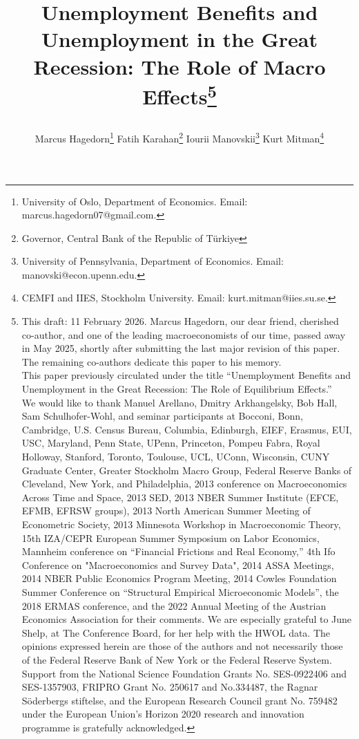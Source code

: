 \documentclass[12pt]{article}
\renewcommand{\baselinestretch}{1.5}
\newcommand{\1}{\mathbf{1}}
\begin{document}
\renewcommand{\baselinestretch}{1}

\title{{ Unemployment Benefits and Unemployment in the Great Recession: The Role of Macro Effects\footnote{This draft: 11 February 2026.
Marcus Hagedorn, our dear friend, cherished co-author, and one of the leading macroeconomists of our time, passed away in May 2025, shortly after submitting the last major revision of this paper. The remaining co-authors dedicate this paper to his memory.\protect\\
\indent This paper previously circulated under the title ``Unemployment Benefits and Unemployment in the Great Recession: The Role of Equilibrium Effects.''\protect\\
\indent We would like to thank Manuel Arellano, Dmitry Arkhangelsky, Bob Hall, Sam Schulhofer-Wohl, and seminar participants at Bocconi, Bonn, Cambridge, U.S. Census Bureau, Columbia, Edinburgh, EIEF, Erasmus, EUI, USC, Maryland, Penn State, UPenn, Princeton, Pompeu Fabra, Royal Holloway, Stanford, Toronto, Toulouse, UCL, UConn, Wisconsin, CUNY Graduate Center, Greater Stockholm Macro Group, Federal Reserve Banks of Cleveland, New York, and Philadelphia, 2013 conference on Macroeconomics Across Time and Space, 2013 SED, 2013 NBER Summer Institute (EFCE, EFMB, EFRSW groups), 2013 North American Summer Meeting of Econometric Society, 2013 Minnesota Workshop in Macroeconomic Theory, 15th IZA/CEPR European Summer Symposium on Labor Economics, Mannheim conference on ``Financial Frictions and Real Economy,'' 4th Ifo Conference on "Macroeconomics and Survey Data", 2014 ASSA Meetings, 2014 NBER Public Economics Program Meeting, 2014 Cowles Foundation Summer Conference on ``Structural Empirical Microeconomic Models'', the 2018 ERMAS conference, and the 2022 Annual Meeting of the Austrian Economics Association for their comments. We are especially grateful to June Shelp, at The Conference Board, for her help with the HWOL data. The opinions expressed herein are those of the authors and not necessarily those of the Federal Reserve Bank of New York or the Federal Reserve System. Support from the National Science Foundation Grants No. SES-0922406 and SES-1357903, FRIPRO Grant No. 250617 and No.334487, the Ragnar S\"oderbergs stiftelse, and the European Research Council grant No. 759482 under the European Union's Horizon 2020 research and innovation programme is gratefully acknowledged.}}
\author{Marcus Hagedorn\thanks{University of Oslo, Department of Economics. Email: marcus.hagedorn07@gmail.com.} \hspace{0.5cm} Fatih Karahan\thanks{Governor, Central Bank of the Republic of T\"{u}rkiye} 
\hspace{0.5cm} Iourii Manovskii\thanks{University of Pennsylvania, Department of Economics.  Email: manovski@econ.upenn.edu.} 
\hspace{0.5cm} Kurt Mitman\thanks{CEMFI and IIES, Stockholm University. Email: kurt.mitman@iies.su.se.}}}
\date{}
\maketitle
\thispagestyle{empty}
\end{document}
